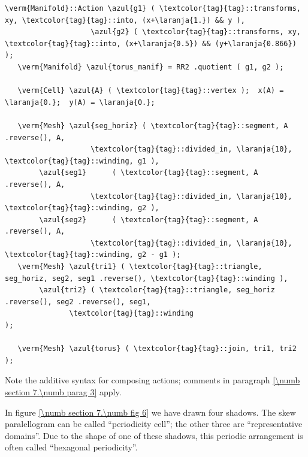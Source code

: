 \begin{Verbatim}[commandchars=\\\{\},formatcom=\small\tt,frame=single,
   label=parag-\ref{\numb section 7.\numb parag 9}.cpp,rulecolor=\color{moldura},
   baselinestretch=0.94,framesep=2mm                                            ]
   \verm{Manifold}::Action \azul{g1} ( \textcolor{tag}{tag}::transforms, xy, \textcolor{tag}{tag}::into, (x+\laranja{1.}) && y ),
                    \azul{g2} ( \textcolor{tag}{tag}::transforms, xy, \textcolor{tag}{tag}::into, (x+\laranja{0.5}) && (y+\laranja{0.866}) );
   \verm{Manifold} \azul{torus_manif} = RR2 .quotient ( g1, g2 );

   \verm{Cell} \azul{A} ( \textcolor{tag}{tag}::vertex );  x(A) = \laranja{0.};  y(A) = \laranja{0.};

   \verm{Mesh} \azul{seg_horiz} ( \textcolor{tag}{tag}::segment, A .reverse(), A,
                    \textcolor{tag}{tag}::divided_in, \laranja{10}, \textcolor{tag}{tag}::winding, g1 ),
        \azul{seg1}      ( \textcolor{tag}{tag}::segment, A .reverse(), A,
                    \textcolor{tag}{tag}::divided_in, \laranja{10}, \textcolor{tag}{tag}::winding, g2 ),
        \azul{seg2}      ( \textcolor{tag}{tag}::segment, A .reverse(), A,
                    \textcolor{tag}{tag}::divided_in, \laranja{10}, \textcolor{tag}{tag}::winding, g2 - g1 );
   \verm{Mesh} \azul{tri1} ( \textcolor{tag}{tag}::triangle, seg_horiz, seg2, seg1 .reverse(), \textcolor{tag}{tag}::winding ),
        \azul{tri2} ( \textcolor{tag}{tag}::triangle, seg_horiz .reverse(), seg2 .reverse(), seg1,
               \textcolor{tag}{tag}::winding                                               );

   \verm{Mesh} \azul{torus} ( \textcolor{tag}{tag}::join, tri1, tri2 );
\end{Verbatim}

Note the additive syntax for composing actions; comments in paragraph
\ref{\numb section 7.\numb parag 3} apply.

In figure \ref{\numb section 7.\numb fig 6} we have drawn four shadows.
The skew paralellogram can be called ``periodicity cell'';
the other three are ``representative domains''.
Due to the shape of one of these shadows, this periodic arrangement is often called
``hexagonal periodicity''.

